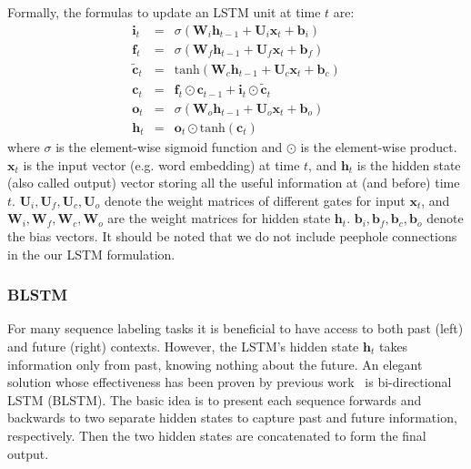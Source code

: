 \documentclass[11pt]{article}
\begin{document}
Formally, the formulas to update an LSTM unit at time $t$ are:
\begin{displaymath}
\begin{array}{rcl}
\mathbf{i}_{t} & = & \sigma(\boldsymbol{W}_i \mathbf{h}_{t-1} + \boldsymbol{U}_i \mathbf{x}_t + \boldsymbol{b}_i) \\
\mathbf{f}_{t} & = & \sigma(\boldsymbol{W}_f \mathbf{h}_{t-1} + \boldsymbol{U}_f \mathbf{x}_t + \boldsymbol{b}_f) \\
\mathbf{\tilde{c}}_t & = & \mathrm{tanh}(\boldsymbol{W}_c \mathbf{h}_{t-1} + \boldsymbol{U}_c \mathbf{x}_t + \boldsymbol{b}_c) \\
\mathbf{c}_{t} & = & \mathbf{f}_t \odot \mathbf{c}_{t-1} + \mathbf{i}_t \odot \mathbf{\tilde{c}}_t \\
\mathbf{o}_{t} & = & \sigma(\boldsymbol{W}_o \mathbf{h}_{t-1} + \boldsymbol{U}_o \mathbf{x}_t + \boldsymbol{b}_o) \\
\mathbf{h}_{t} & = & \mathbf{o}_{t} \odot \mathrm{tanh}(\mathbf{c}_t)
\end{array}
\end{displaymath}
where $\sigma$ is the element-wise sigmoid function and $\odot$ is the element-wise product. $\mathbf{x}_t$ is the input vector (e.g. word embedding) at time $t$, and $\mathbf{h}_t$ is the hidden state (also called output) vector storing all the useful information at (and before) time $t$. 
$\boldsymbol{U}_i, \boldsymbol{U}_f, \boldsymbol{U}_c, \boldsymbol{U}_o$ denote the weight matrices of different gates for input $\mathbf{x}_t$, and $\boldsymbol{W}_i, \boldsymbol{W}_f, \boldsymbol{W}_c, \boldsymbol{W}_o$ are the weight matrices for hidden state $\mathbf{h}_t$. $\boldsymbol{b}_i, \boldsymbol{b}_f, \boldsymbol{b}_c, \boldsymbol{b}_o$ denote the bias vectors. It should be noted that we do not include peephole connections~\cite{gers2003learning} in the our LSTM formulation.

\subsubsection{BLSTM}
For many sequence labeling tasks it is beneficial to have access to both past (left) and future (right) contexts. However, the LSTM's hidden state $\mathbf{h}_t$ takes information only from past, knowing nothing about the future. An elegant solution whose effectiveness has been proven by previous work~\cite{dyer-EtAl:2015:ACL-IJCNLP} is bi-directional LSTM (BLSTM). The basic idea is to present each sequence forwards and backwards to two separate hidden states to capture past and future information, respectively. Then the two hidden states are concatenated to form the final output.
\end{document}
